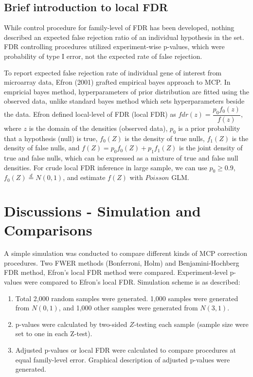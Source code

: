 \documentclass[a4paper, 11pt, oneside]{article}
\begin{document}
\subsection{Brief introduction to local FDR}
While control procedure for family-level of FDR has been developed, nothing described an expected false rejection ratio of an individual hypothesis in the set. FDR controlling procedures utilized experiment-wise p-values, which were probability of type I error, not the expected rate of false rejection. \par
    To report expected false rejection rate of individual gene of interest from microarray data, Efron (2001) grafted empirical bayes approach to MCP. In empricial bayes method, hyperparameters of prior distribution are fitted using the observed data, unlike standard bayes method which sets hyperparameters beside the data. Efron defined local-level of FDR (local FDR) as $fdr(z)=\dfrac{p_0 f_0(z)}{f(z)}$, where $z$ is the domain of the densities (observed data), $p_0$ is a prior probability that a hypothesis (null) is true, $f_0(Z)$ is the density of true nulls, $f_1(Z)$ is the density of false nulls, and $f(Z)=p_0f_0(Z) + p_1f_1(Z)$ is the joint density of true and false nulls, which can be expressed as a mixture of true and false null densities. For crude local FDR inference in large sample, we can use $p_0 \geq 0.9$, $f_0(Z) \stackrel{d}{=} N(0, 1)$, and estimate $f(Z)$ with $Poisson$ GLM.

\vspace{0.2in}


\section{Discussions - Simulation and Comparisons}
A simple simulation was conducted to compare different kinds of MCP correction procedures. Two FWER methods (Bonferroni, Holm) and Benjamini-Hochberg FDR method, Efron's local FDR method were compared. Experiment-level p-values were compared to Efron's local FDR. Simulation scheme is as described:
\begin{enumerate}
  \item Total 2,000 random samples were generated. 1,000 samples were generated from $N(0, 1)$, and 1,000 other samples were generated from $N(3, 1)$.
  \item p-values were calculated by two-sided $Z$-testing each sample (sample size were set to one in each Z-test).
 \item Adjusted p-values or local FDR were calculated to compare procedures at equal family-level error. Graphical description of adjusted p-values were generated.
\end{enumerate}
\end{document}
